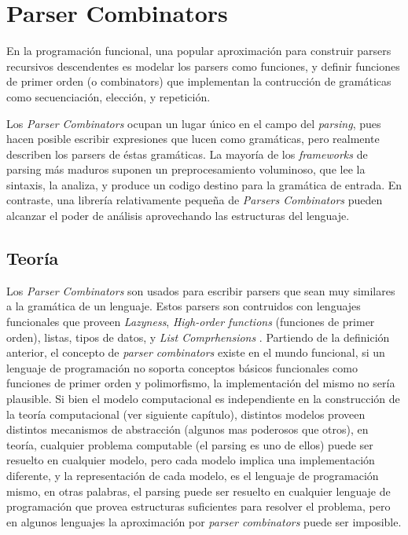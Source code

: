 
\chapter{Parser Combinators}

En la programación funcional, una popular aproximación para construir parsers recursivos descendentes es modelar los parsers como funciones, y definir funciones de primer orden (o combinators) que implementan la contrucción de gramáticas como secuenciación, elección, y repetición.\cite{Hutton1996}

Los \emph{Parser Combinators} ocupan un lugar único en el campo del \emph{parsing}, pues hacen posible escribir expresiones que lucen como gramáticas, pero realmente describen los parsers de éstas gramáticas. La mayoría de los \emph{frameworks} de parsing más maduros suponen un preprocesamiento voluminoso, que lee la sintaxis, la analiza, y produce un codigo destino para la gramática de entrada. En contraste, una librería relativamente pequeña de \emph{Parsers Combinators} pueden alcanzar el poder de análisis aprovechando las estructuras del lenguaje.\cite{Swierstra2008}


\section{Teoría}

Los \emph{Parser Combinators} son usados para escribir parsers que sean muy similares a la gramática de un lenguaje. Estos parsers son contruidos con lenguajes funcionales que proveen \emph{Lazyness}, \emph{High-order functions} (funciones de primer orden), listas, tipos de datos, y \emph{List Comprhensions} \cite{Jeuring2010}. Partiendo de la definición anterior, el concepto de \emph{parser combinators} existe en el mundo funcional, si un lenguaje de programación no soporta conceptos básicos funcionales como funciones de primer orden y polimorfismo, la implementación del mismo no sería plausible. Si bien el modelo computacional es independiente en la construcción de la teoría computacional (ver siguiente capítulo), distintos modelos proveen distintos mecanismos de abstracción (algunos mas poderosos que otros), en teoría, cualquier problema computable (el parsing es uno de ellos) puede ser resuelto en cualquier modelo, pero cada modelo implica una implementación diferente, y la representación de cada modelo, es el lenguaje de programación mismo, en otras palabras, el parsing puede ser resuelto en cualquier lenguaje de programación que provea estructuras suficientes para resolver el problema, pero en algunos lenguajes la aproximación por \emph{parser combinators} puede ser imposible.

